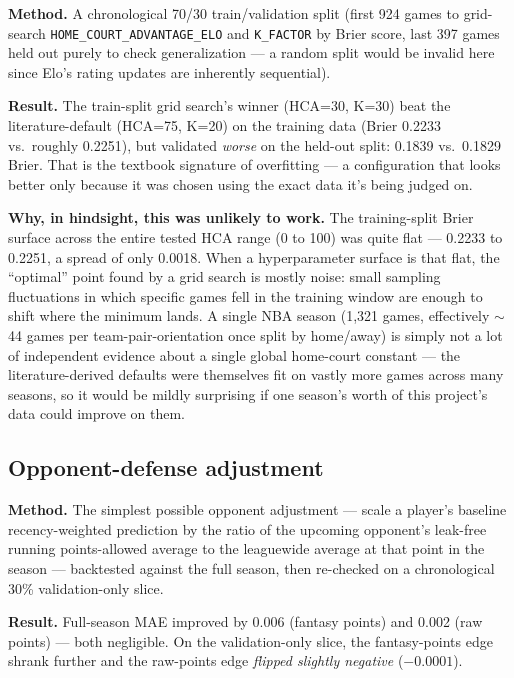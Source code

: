 \documentclass[11pt]{article}
\newcommand{\code}[1]{\allowbreak\texttt{\small #1}\allowbreak}
\begin{document}
\textbf{Method.} A chronological 70/30 train/validation split (first 924 games to grid-search
\code{HOME\_COURT\_ADVANTAGE\_ELO} and \code{K\_FACTOR} by Brier score, last 397 games held out purely to
check generalization — a random split would be invalid here since Elo's rating updates are inherently
sequential).

\textbf{Result.} The train-split grid search's winner (HCA=30, K=30) beat the literature-default (HCA=75,
K=20) on the training data (Brier 0.2233 vs.\ roughly 0.2251), but validated \emph{worse} on the held-out
split: 0.1839 vs.\ 0.1829 Brier. That is the textbook signature of overfitting — a configuration that looks
better only because it was chosen using the exact data it's being judged on.

\textbf{Why, in hindsight, this was unlikely to work.} The training-split Brier surface across the entire
tested HCA range (0 to 100) was quite flat — 0.2233 to 0.2251, a spread of only 0.0018. When a hyperparameter
surface is that flat, the ``optimal'' point found by a grid search is mostly noise: small sampling
fluctuations in which specific games fell in the training window are enough to shift where the minimum
lands. A single NBA season (1,321 games, effectively $\sim$44 games per team-pair-orientation once split by
home/away) is simply not a lot of independent evidence about a single global home-court constant — the
literature-derived defaults were themselves fit on vastly more games across many seasons, so it would be
mildly surprising if one season's worth of this project's data could improve on them.

\subsection{Opponent-defense adjustment}
\label{sec:opponent}

\textbf{Method.} The simplest possible opponent adjustment — scale a player's baseline recency-weighted
prediction by the ratio of the upcoming opponent's leak-free running points-allowed average to the
leaguewide average at that point in the season — backtested against the full season, then re-checked on a
chronological 30\% validation-only slice.

\textbf{Result.} Full-season MAE improved by 0.006 (fantasy points) and 0.002 (raw points) — both
negligible. On the validation-only slice, the fantasy-points edge shrank further and the raw-points edge
\emph{flipped slightly negative} ($-0.0001$).
\end{document}
